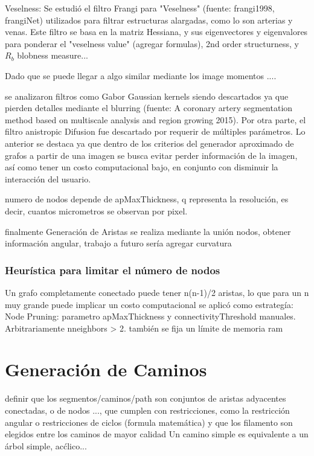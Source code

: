Veselness: Se estudió el filtro Frangi para "Veselness" (fuente: frangi1998, frangiNet) utilizados para filtrar estructuras alargadas, como lo son arterias y venas. Este filtro se basa en la matriz Hessiana, y sus eigenvectores y eigenvalores para ponderar el "veselness value" (agregar formulas), 2nd order structurness, y $R_b$ blobness measure...

Dado que se puede llegar a algo similar mediante los image momentos ....

se analizaron filtros como Gabor Gaussian kernels siendo descartados ya que pierden detalles mediante el blurring (fuente: A coronary artery segmentation method based on multiscale analysis and region growing 2015). Por otra parte, el filtro  anistropic Difusion fue descartado por requerir de múltiples parámetros. 
Lo anterior se destaca ya que dentro de los criterios del generador aproximado de grafos a partir de una imagen se busca evitar perder información de la imagen, así como tener un costo computacional bajo, en conjunto con disminuir la interacción del usuario. 

numero de nodos depende de apMaxThickness, q representa la resoluci\'on, es decir, cuantos micrometros se observan por pixel.

finalmente Generaci\'on de Aristas se realiza mediante la uni\'on nodos, obtener informaci\'on angular, trabajo a futuro ser\'ia agregar curvatura 

\subsubsection{Heurística para limitar el n\'umero de nodos}
Un grafo completamente conectado puede tener n(n-1)/2 aristas, lo que para un n muy grande puede implicar un costo computacional se aplicó como estrategía: 
Node Pruning: parametro apMaxThickness y connectivityThreshold manuales. Arbitrariamente n\textdegree neighbors > 2. también se fija un límite de memoria ram


\section{Generaci\'on de Caminos}
definir que los segmentos/caminos/path son conjuntos de aristas adyacentes conectadas, o de nodos ..., que cumplen con restricciones, como la restricción angular o restricciones de ciclos (formula matem\'atica) y que los filamento son elegidos entre los caminos de mayor calidad
Un camino simple es equivalente a un \'arbol simple, ac\'clico...


